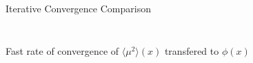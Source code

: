 \documentclass[10pt]{beamer}
\newcommand{\edd}{\langle \mu^2 \rangle}
\begin{document}
\begin{frame}{Iterative Convergence Comparison}
\begin{columns}
		\begin{column}{.55\textwidth}
		\begin{figure}
			\centering
		\end{figure}
		\end{column}
		\begin{column}{.55\textwidth}
		\begin{figure}
			\centering
		\end{figure}
		\end{column}
	\end{columns}

	\vspace{.2in}
	\begin{block}{}
	\centerline{Fast rate of convergence of $\edd(x)$ transfered to $\phi(x)$}
	\end{block}

\end{frame}
\end{document}
